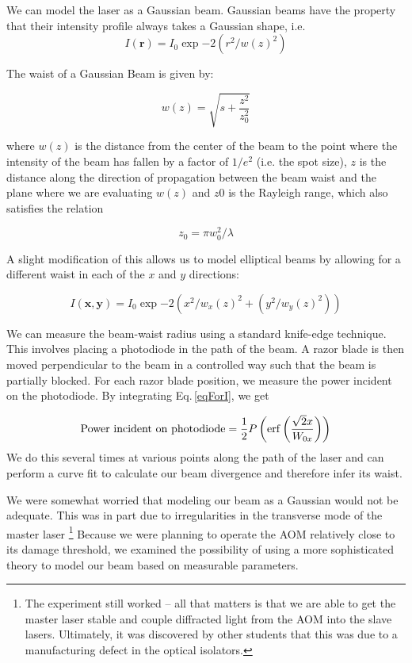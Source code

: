 We can model the laser as a Gaussian beam. Gaussian beams have the property that their intensity profile always takes a Gaussian shape, i.e. \cite{lasersMilonniEberly}
\begin{equation}
    I(\mathbf{r})=I_0\exp{-2(r^2/w(z)^2)}
\end{equation}

The waist of a Gaussian Beam is given by:

\begin{equation}
    w(z)=\sqrt{s+\frac{z^2}{z_0^2}}
\end{equation}

where $w(z)$ is the distance from the center of the beam to the point where the intensity of the beam has fallen by a factor of $1/e^2$ (i.e. the spot size), $z$ is the distance along the direction of propagation between the beam waist and the plane where we are evaluating $w(z)$ and $z0$ is the Rayleigh range, which also satisfies the relation 

\begin{equation}
    z_0=\pi w_0^2/\lambda
\end{equation}

A slight modification of this allows us to model elliptical beams by allowing for a different waist in each of the $x$ and $y$ directions:

\begin{equation}\label{eqForI}
    I(\mathbf{x,y})=I_0\exp{-2(x^2/w_x(z)^2+(y^2/w_y(z)^2))}
\end{equation}

We can measure the beam-waist radius using a standard knife-edge technique. This involves placing a photodiode in the path of the beam.  A razor blade is then moved perpendicular to the beam in a controlled way such that the beam is partially blocked. For each razor blade position, we measure the power incident on the photodiode. By integrating Eq.\,\ref{eqForI}, we get

\begin{equation}
{\rm Power\ incident\ on\ photodiode}=\frac{1}{2} P \left(\erf \left( \frac{\sqrt{2} x}{W_{0x}}\right)\right)
\end{equation}
We do this several times at various points along the path of the laser and can perform a curve fit to calculate our beam divergence and therefore infer its waist.

We were somewhat worried that modeling our beam as a Gaussian would not be adequate. This was in part due to irregularities in the transverse mode of the master laser \footnote{The experiment still worked -- all that matters is that we are able to get the master laser stable and couple diffracted light from the AOM into the slave lasers. Ultimately, it was discovered by other students that this was due to a manufacturing defect in the optical isolators.} Because we were planning to operate the AOM relatively close to its damage threshold, we examined the possibility of using a more sophisticated theory to model our beam based on measurable parameters. 

